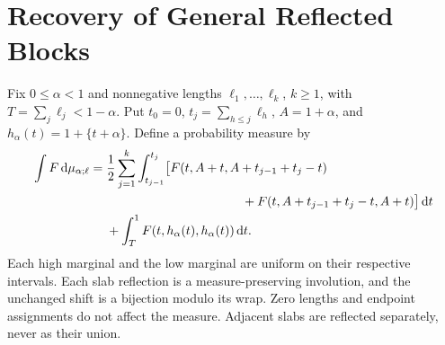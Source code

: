 \documentclass[11pt,letterpaper]{article}
\newcommand{\dd}{\,\mathrm d}
\begin{document}
\section{Recovery of General Reflected Blocks}\label{sec:transfer}
Fix $0\le\alpha<1$ and nonnegative lengths $\ell_1,\ldots,\ell_k$,
$k\ge1$, with $T=\sum_j\ell_j<1-\alpha$. Put $t_0=0$,
$t_j=\sum_{h\le j}\ell_h$, $A=1+\alpha$, and
$h_\alpha(t)=1+\{t+\alpha\}$. Define a probability measure by
\begin{equation}\label{eq:mu}
\begin{split}
 \int F\dd\mu_{\alpha;\ell}
 ={}&\frac12\sum_{j=1}^k\int_{t_{j-1}}^{t_j}
 \bigl[F(t,A+t,A+t_{j-1}+t_j-t)\\
 &\hspace{38mm}+F(t,A+t_{j-1}+t_j-t,A+t)\bigr]\dd t\\
 &+\int_T^1F(t,h_\alpha(t),h_\alpha(t))\dd t.
\end{split}
\end{equation}
Each high marginal and the low marginal are uniform on their respective
intervals. Each slab reflection is a measure-preserving involution, and
the unchanged shift is a bijection modulo its wrap. Zero lengths and
endpoint assignments do not affect the measure. Adjacent slabs are
reflected separately, never as their union.
\end{document}
